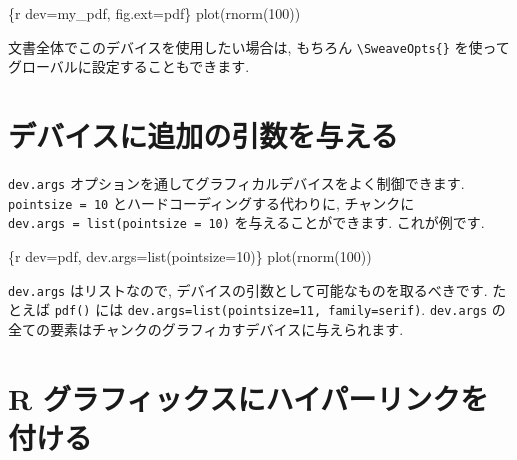 \documentclass[
]{bxjsreport}
\newenvironment{Shaded}{\begin{snugshade}}{\end{snugshade}}
\newcommand{\AttributeTok}[1]{\textcolor[rgb]{0.77,0.63,0.00}{#1}}
\newcommand{\StringTok}[1]{\textcolor[rgb]{0.31,0.60,0.02}{#1}}
\begin{document}
\begin{Shaded}
\begin{Highlighting}[]
\StringTok{\textasciigrave{}\textasciigrave{}\textasciigrave{}}\AttributeTok{\{r dev=\textquotesingle{}my\_pdf\textquotesingle{}, fig.ext=\textquotesingle{}pdf\textquotesingle{}\}}
\AttributeTok{plot(rnorm(100))}
\StringTok{\textasciigrave{}\textasciigrave{}\textasciigrave{}}
\end{Highlighting}
\end{Shaded}

文書全体でこのデバイスを使用したい場合は, もちろん
\texttt{\textbackslash{}SweaveOpts\{\}}
を使ってグローバルに設定することもできます.

\hypertarget{ux30c7ux30d0ux30a4ux30b9ux306bux8ffdux52a0ux306eux5f15ux6570ux3092ux4e0eux3048ux308b}{%
\section*{デバイスに追加の引数を与える}\label{ux30c7ux30d0ux30a4ux30b9ux306bux8ffdux52a0ux306eux5f15ux6570ux3092ux4e0eux3048ux308b}}

\texttt{dev.args}
オプションを通してグラフィカルデバイスをよく制御できます.
\texttt{pointsize\ =\ 10} とハードコーディングする代わりに, チャンクに
\texttt{dev.args\ =\ list(pointsize\ =\ 10)} を与えることができます.
これが例です.

\begin{Shaded}
\begin{Highlighting}[]
\StringTok{\textasciigrave{}\textasciigrave{}\textasciigrave{}}\AttributeTok{\{r dev=\textquotesingle{}pdf\textquotesingle{}, dev.args=list(pointsize=10)\}}
\AttributeTok{plot(rnorm(100))}
\StringTok{\textasciigrave{}\textasciigrave{}\textasciigrave{}}
\end{Highlighting}
\end{Shaded}

\texttt{dev.args} はリストなので,
デバイスの引数として可能なものを取るべきです. たとえば \texttt{pdf()}
には
\texttt{dev.args=list(pointsize=11,\ family=\textquotesingle{}serif\textquotesingle{})}.
\texttt{dev.args}
の全ての要素はチャンクのグラフィカすデバイスに与えられます.

\hypertarget{r-ux30b0ux30e9ux30d5ux30a3ux30c3ux30afux30b9ux306bux30cfux30a4ux30d1ux30fcux30eaux30f3ux30afux3092ux4ed8ux3051ux308b}{%
\section*{R
グラフィックスにハイパーリンクを付ける}\label{r-ux30b0ux30e9ux30d5ux30a3ux30c3ux30afux30b9ux306bux30cfux30a4ux30d1ux30fcux30eaux30f3ux30afux3092ux4ed8ux3051ux308b}}
\end{document}
